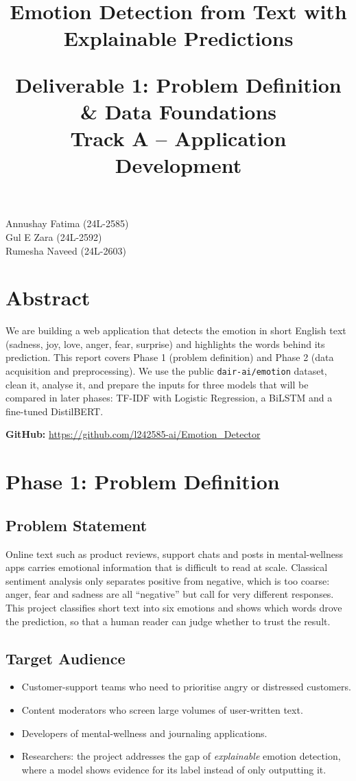 \documentclass[12pt]{article}
\title{\textbf{Emotion Detection from Text with Explainable Predictions}\\
\date{}
\large Deliverable 1: Problem Definition \& Data Foundations\\[2pt]
\normalsize Track A -- Application Development}
\author{}
\begin{document}
\maketitle
\vspace{-6em}
\begin{flushleft}
\large
Annushay Fatima (24L-2585)\\
Gul E Zara (24L-2592)\\
Rumesha Naveed (24L-2603)
\end{flushleft}
\vspace{-1.5em}


\section*{Abstract}
We are building a web application that detects the emotion in short English text (sadness, joy, love, anger, fear, surprise) and highlights the words behind its prediction. This report covers Phase 1 (problem definition) and Phase 2 (data acquisition and preprocessing). We use the public \texttt{dair-ai/emotion} dataset, clean it, analyse it, and prepare the inputs for three models that will be compared in later phases: TF-IDF with Logistic Regression, a BiLSTM and a fine-tuned DistilBERT.

\medskip
\noindent \textbf{GitHub:} \url{https://github.com/l242585-ai/Emotion_Detector}
\section{Phase 1: Problem Definition}

\subsection{Problem Statement}
Online text such as product reviews, support chats and posts in mental-wellness apps carries emotional information that is difficult to read at scale. Classical sentiment analysis only separates positive from negative, which is too coarse: anger, fear and sadness are all ``negative'' but call for very different responses. This project classifies short text into six emotions and shows which words drove the prediction, so that a human reader can judge whether to trust the result.

\subsection{Target Audience}
\begin{itemize}
  \item Customer-support teams who need to prioritise angry or distressed customers.
  \item Content moderators who screen large volumes of user-written text.
  \item Developers of mental-wellness and journaling applications.
  \item Researchers: the project addresses the gap of \emph{explainable} emotion detection, where a model shows evidence for its label instead of only outputting it.
\end{itemize}
\end{document}
